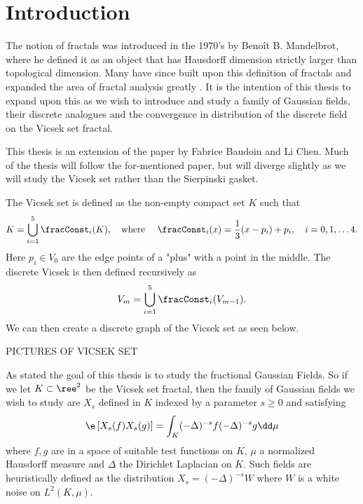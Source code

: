 \chapter{Introduction}

The notion of fractals was introduced in the 1970's by Benoît B. Mandelbrot, where he defined it as an object that has Hausdorff dimension strictly larger than topological dimension. Many have since built upon this definition of fractals and expanded the area of fractal analysis greatly \cite{Falconer_1985, barlow, Kigami_2001, specAnal}. It is the intention of this thesis to expand upon this as we wish to introduce and study a family of Gaussian fields, their discrete analogues and the convergence in distribution of the discrete field on the Vicsek set fractal.  

This thesis is an extension of the paper \cite{Fabrice} by Fabrice Baudoin and Li Chen. Much of the thesis will follow the for-mentioned paper, but will diverge slightly as we will study the Vicsek set rather than the Sierpinski gasket. 

The Vicsek set is defined as the non-empty compact set $K$ such that
\begin{equation}
	K = \bigcup_{i = 1}^{5} \fracConst_i(K), \quad \text{where } \quad \fracConst_i(x) = \frac{1}{3}(x-p_i) + p_i, \quad i = 0, 1,\ldots 4.
\end{equation}
Here $p_i \in V_0$ are the edge points of a "plus" with a point in the middle. The discrete Vicsek is then defined recursively as
\begin{equation}
	V_m = \bigcup_{i = 1}^{5} \fracConst_i(V_{m-1}).
\end{equation}
We can then create a discrete graph of the Vicsek set as seen below.
%
\begin{center}
	\LARGE PICTURES OF VICSEK SET
\end{center}

As stated the goal of this thesis is to study the fractional Gaussian Fields. So if we let $K \subset \ree^{2}$ be the Vicsek set fractal, then the family of Gaussian fields we wish to study are $X_s$ defined in $K$ indexed by a parameter $s \geq 0$ and satisfying
\begin{equation}
	\e \left[X_{s}(f)X_{s}(g)\right] = \int_{K} (-\Delta)^{-s}f(-\Delta)^{-s}g \dd \mu
\end{equation}
where $f,g$ are in a space of suitable test functions on $K$, $\mu$ a normalized Hausdorff measure and $\Delta$ the Dirichlet Laplacian on $K$. Such fields are heuristically defined as the distribution $X_s = (-\Delta)^{-s}W$ where $W$ is a white noise on $L^{2}(K, \mu)$.

